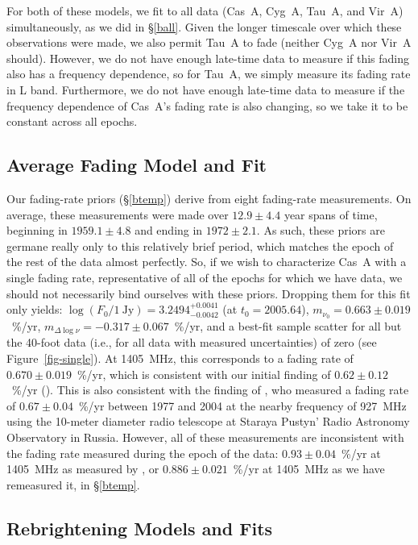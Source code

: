 \documentclass[fleqn,usenatbib]{mnras}
\begin{document}
For both of these models, we fit to all data (Cas~A, Cyg~A, Tau~A, and Vir~A) simultaneously, as we did in \S\ref{ball}.  Given the longer timescale over which these observations were made, we also permit Tau~A to fade (neither Cyg~A nor Vir~A should).  However, we do not have enough late-time data to measure if this fading also has a frequency dependence, so for Tau~A, we simply measure its fading rate in L band.  Furthermore, we do not have enough late-time data to measure if the frequency dependence of Cas~A's fading rate is also changing, so we take it to be constant across all epochs. 

\subsection{Average Fading Model and Fit}\label{average}

Our fading-rate priors (\S\ref{btemp}) derive from eight fading-rate measurements.  On average, these measurements were made over $12.9 \pm 4.4$ year spans of time, beginning in $1959.1 \pm 4.8$ and ending in $1972 \pm 2.1$.  As such, these priors are germane really only to this relatively brief period, which matches the epoch of the rest of the \citet{b77} data almost perfectly.  So, if we wish to characterize Cas~A with a single fading rate, representative of all of the epochs for which we have data, we should not necessarily bind ourselves with these priors.  Dropping them for this fit only yields:  $\log (F_0/1~\mathrm{Jy}) = 3.2494^{+0.0041}_{-0.0042}$ (at $t_0 = 2005.64$), $m_{\nu_0} = 0.663 \pm 0.019$~\%/yr, $m_{\Delta\log\nu} = -0.317 \pm 0.067$~\%/yr, and a best-fit sample scatter for all but the 40-foot data (i.e., for all data with measured uncertainties) of zero (see Figure~\ref{fig-single}).  At 1405~MHz, this corresponds to a fading rate of $0.670 \pm 0.019$~\%/yr, which is consistent with our initial finding of $0.62 \pm 0.12$~\%/yr (\citealt{r00}).  This is also consistent with the finding of \citet{v07a}, who measured a fading rate of $0.67\pm0.04$~\%/yr between 1977 and 2004 at the nearby frequency of 927~MHz using the 10-meter diameter radio telescope at Staraya Pustyn' Radio Astronomy Observatory in Russia.  However, all of these measurements are inconsistent with the fading rate measured during the epoch of the \citet{b77} data:  $0.93 \pm 0.04$~\%/yr at 1405~MHz as measured by \citet{b77}, or $0.886 \pm 0.021$~\%/yr at 1405~MHz as we have remeasured it, in \S\ref{btemp}.

\subsection{Rebrightening Models and Fits}\label{rebrightening}
\end{document}
